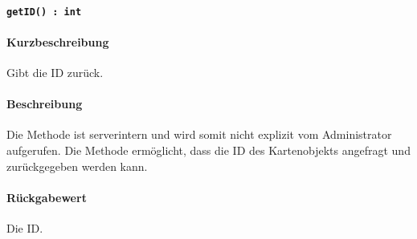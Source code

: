 \paragraph{\texttt{getID() : int}}%
\paragraph*{Kurzbeschreibung}
Gibt die ID zurück.
\paragraph*{Beschreibung}
Die Methode ist serverintern und wird somit nicht explizit vom Administrator aufgerufen.
Die Methode ermöglicht, dass die ID des Kartenobjekts angefragt und zurückgegeben werden kann.
\paragraph*{Rückgabewert}
Die ID.
